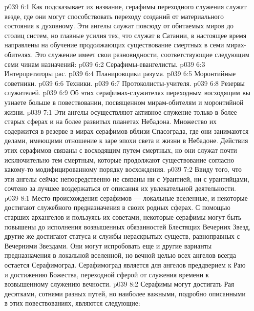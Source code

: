 \vs p039 6:1 Как подсказывает их название, серафимы переходного служения служат везде, где они могут способствовать переходу созданий от материального состояния к духовному. Эти ангелы служат повсюду от обитаемых миров до столиц систем, но главные усилия тех, что служат в Сатании, в настоящее время направлены на обучение продолжающих существование смертных в семи мирах\hyp{}обителях. Это служение имеет свои разновидности, соответствующие следующим семи чинам назначений:
\vs p039 6:2 \bibnobreakspace Серафимы\hyp{}евангелисты.
\vs p039 6:3 \bibnobreakspace Интерпретаторы рас.
\vs p039 6:4 \bibnobreakspace Планировщики разума.
\vs p039 6:5 \bibnobreakspace Моронтийные советники.
\vs p039 6:6 \bibnobreakspace Техники.
\vs p039 6:7 \bibnobreakspace Протоколисты\hyp{}учителя.
\vs p039 6:8 \bibnobreakspace Резервы служителей.
\vs p039 6:9 \pc Об этих серафимах\hyp{}служителях переходным восходящим вы узнаете больше в повествовании, посвященном мирам\hyp{}обителям и моронтийной жизни.
\vs p039 7:1 Эти ангелы осуществляют активное служение только в более старых сферах и на более развитых планетах Небадона. Множество их содержится в резерве в мирах серафимов вблизи Спасограда, где они занимаются делами, имеющими отношение к заре эпохи света и жизни в Небадоне. Действия этих серафимов связаны с восходящим путем смертных, но они служат почти исключительно тем смертным, которые продолжают существование согласно какому\hyp{}то модифицированному порядку восхождения.
\vs p039 7:2 Ввиду того, что эти ангелы сейчас непосредственно не связаны ни с Урантией, ни с урантийцами, сочтено за лучшее воздержаться от описания их увлекательной деятельности.
\vs p039 8:1 Место происхождения серафимов --- локальные вселенные, и некоторые достигают служебного предназначения в своих родных сферах. С помощью старших архангелов и пользуясь их советами, некоторые серафимы могут быть повышены до исполнения возвышенных обязанностей Блестящих Вечерних Звезд, другие же достигают статуса и службы нераскрытых существ, равноправных с Вечерними Звездами. Они могут испробовать еще и другие варианты предназначения в локальной вселенной, но вечной целью всех ангелов всегда остается Серафимоград. Серафимоград является для ангелов преддверием к Раю и достижению Божества, переходной сферой от служения времени к возвышенному служению вечности.
\vs p039 8:2 \pc Серафимы могут достигать Рая десятками, сотнями разных путей, но наиболее важными, подробно описанными в этих повествованиях, являются следующие:
